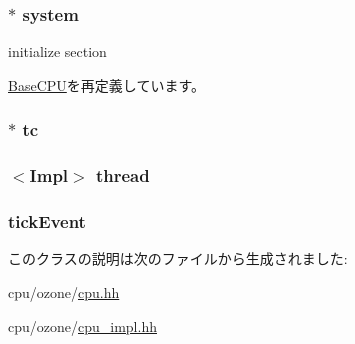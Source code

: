 \label{classOzoneCPU_a823cf9753f27fd4c4fcca316a570c304}
\hypertarget{classOzoneCPU_af27ccd765f13a4b7bd119dc7579e2746}{
\subsubsection[{system}]{$\ast$ {\bf system}}}
\label{classOzoneCPU_af27ccd765f13a4b7bd119dc7579e2746}


initialize section 

\hyperlink{classBaseCPU_ab737471139f5a296e5b26e8a0e1b0744}{BaseCPU}を再定義しています。\hypertarget{classOzoneCPU_a4455a4759e69e5ebe68ae7298cbcc37d}{
\subsubsection[{tc}]{$\ast$ {\bf tc}}}
\label{classOzoneCPU_a4455a4759e69e5ebe68ae7298cbcc37d}
\hypertarget{classOzoneCPU_a46c1be14c8c6673c367ce5c278305858}{
\subsubsection[{thread}]{$<$Impl$>$ {\bf thread}}}
\label{classOzoneCPU_a46c1be14c8c6673c367ce5c278305858}
\hypertarget{classOzoneCPU_aa36b8e894416f0ec98f701ab08f2ac22}{
\subsubsection[{tickEvent}]{ {\bf tickEvent}}}
\label{classOzoneCPU_aa36b8e894416f0ec98f701ab08f2ac22}


このクラスの説明は次のファイルから生成されました:\begin{DoxyCompactItemize}
\item 
cpu/ozone/\hyperlink{ozone_2cpu_8hh}{cpu.hh}\item 
cpu/ozone/\hyperlink{ozone_2cpu__impl_8hh}{cpu\_\-impl.hh}\end{DoxyCompactItemize}
